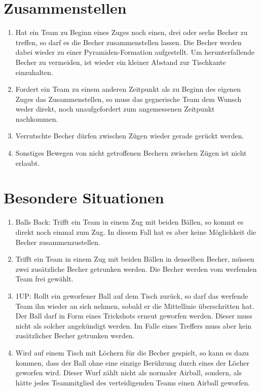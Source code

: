 \section{Zusammenstellen}
\begin{enumerate}[label={(\arabic*)}]
    \item
    Hat ein Team zu Beginn eines Zuges noch einen, drei oder sechs Becher zu treffen, so darf es die Becher zusammenstellen lassen.
    Die Becher werden dabei wieder zu einer Pyramiden-Formation aufgestellt.
    Um herunterfallende Becher zu vermeiden, ist wieder ein kleiner Abstand zur Tischkante einzuhalten.

    \item
    Fordert ein Team zu einem anderen Zeitpunkt als zu Beginn des eigenen Zuges das Zusammenstellen, so muss das gegnerische Team dem Wunsch weder direkt, noch unaufgefordert zum angemessenen Zeitpunkt nachkommen.

    \item
    Verrutschte Becher dürfen zwischen Zügen wieder gerade gerückt werden.

    \item
    Sonstiges Bewegen von nicht getroffenen Bechern zwischen Zügen ist nicht erlaubt.
\end{enumerate}

\section{Besondere Situationen}
\begin{enumerate}[label={(\arabic*)}]
    \item
    \glqq{}Balls Back\grqq{}: Trifft ein Team in einem Zug mit beiden Bällen, so kommt es direkt noch einmal zum Zug.
    In diesem Fall hat es aber keine Möglichkeit die Becher zusammenzustellen.

    \item
    Trifft ein Team in einem Zug mit beiden Bällen in denselben Becher, müssen zwei zusätzliche Becher getrunken werden.
    Die Becher werden vom werfenden Team frei gewählt.

    \item
    \glqq{}1UP\grqq{}: Rollt ein geworfener Ball auf dem Tisch zurück, so darf das werfende Team ihn wieder an sich nehmen, sobald er die Mittellinie überschritten hat.
    Der Ball darf in Form eines Trickshots erneut geworfen werden.
    Dieser muss nicht als solcher angekündigt werden.
    Im Falle eines Treffers muss aber kein zusätzlicher Becher getrunken werden.

    \item
    Wird auf einem Tisch mit Löchern für die Becher gespielt, so kann es dazu kommen, dass der Ball ohne eine einzige Berührung durch eines der Löcher geworfen wird.
    Dieser Wurf zählt nicht als normaler Airball, sondern, als hätte jedes Teammitglied des verteidigenden Teams einen Airball geworfen.
\end{enumerate}
